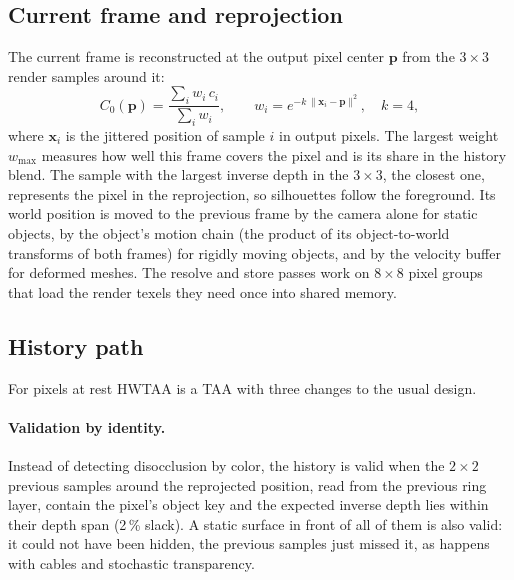 \documentclass[11pt,a4paper]{article}
\newcommand{\vect}[1]{\mathbf{#1}}
\begin{document}
\subsection{Current frame and reprojection}
\label{sec:current}

The current frame is reconstructed at the output pixel center $\vect p$ from the $3\times3$ render samples around it:
\begin{equation}
C_0(\vect p) = \frac{\sum_i w_i\, c_i}{\sum_i w_i}, \qquad w_i = e^{-k\,\|\vect x_i - \vect p\|^2}, \quad k = 4,
\label{eq:current}
\end{equation}
where $\vect x_i$ is the jittered position of sample $i$ in output pixels. The largest weight $w_{\max}$ measures how well this frame covers the pixel and is its share in the history blend. The sample with the largest inverse depth in the $3\times3$, the closest one, represents the pixel in the reprojection, so silhouettes follow the foreground. Its world position is moved to the previous frame by the camera alone for static objects, by the object's motion chain (the product of its object-to-world transforms of both frames) for rigidly moving objects, and by the velocity buffer for deformed meshes. The resolve and store passes work on $8\times8$ pixel groups that load the render texels they need once into shared memory.

\subsection{History path}
\label{sec:history}

For pixels at rest HWTAA is a TAA with three changes to the usual design.

\paragraph{Validation by identity.} Instead of detecting disocclusion by color, the history is valid when the $2\times2$ previous samples around the reprojected position, read from the previous ring layer, contain the pixel's object key and the expected inverse depth lies within their depth span (2\,\% slack). A static surface in front of all of them is also valid: it could not have been hidden, the previous samples just missed it, as happens with cables and stochastic transparency.
\end{document}
